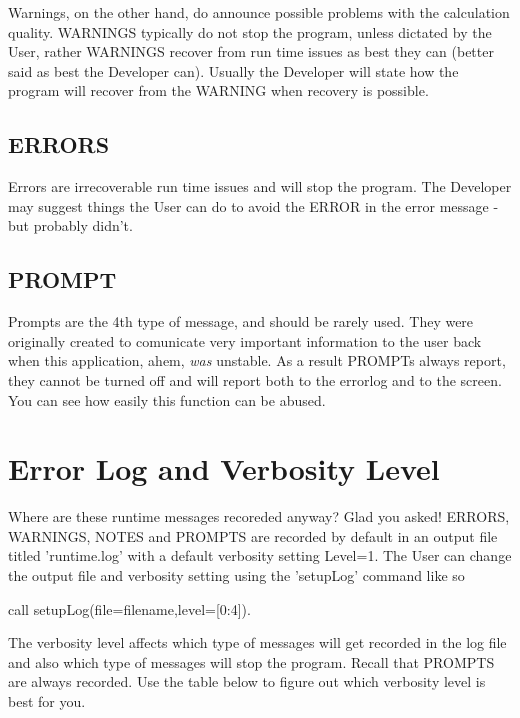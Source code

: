 Warnings, on the other hand, do announce possible problems with the calculation quality. W\-A\-R\-N\-I\-N\-G\-S typically do not stop the program, unless dictated by the User, rather W\-A\-R\-N\-I\-N\-G\-S recover from run time issues as best they can (better said as best the Developer can). Usually the Developer will state how the program will recover from the W\-A\-R\-N\-I\-N\-G when recovery is possible.\par
 \hypertarget{_interface_ERRORS}{}\subsection{E\-R\-R\-O\-R\-S}\label{_interface_ERRORS}
Errors are irrecoverable run time issues and will stop the program. The Developer may suggest things the User can do to avoid the E\-R\-R\-O\-R in the error message -\/ but probably didn't.\par
 \hypertarget{_interface_PROMPT}{}\subsection{P\-R\-O\-M\-P\-T}\label{_interface_PROMPT}
Prompts are the 4th type of message, and should be rarely used. They were originally created to comunicate very important information to the user back when this application, ahem, {\itshape was} unstable. As a result P\-R\-O\-M\-P\-Ts always report, they cannot be turned off and will report both to the errorlog and to the screen. You can see how easily this function can be abused.\par
 \hypertarget{_interface_ERRORLOG}{}\section{Error Log and Verbosity Level}\label{_interface_ERRORLOG}
Where are these runtime messages recoreded anyway? Glad you asked! E\-R\-R\-O\-R\-S, W\-A\-R\-N\-I\-N\-G\-S, N\-O\-T\-E\-S and P\-R\-O\-M\-P\-T\-S are recorded by default in an output file titled 'runtime.\-log' with a default verbosity setting Level=1. The User can change the output file and verbosity setting using the 'setup\-Log' command like so\par
 \par
 call setup\-Log(file=filename,level=\mbox{[}0\-:4\mbox{]}).\par
 \par
 The verbosity level affects which type of messages will get recorded in the log file and also which type of messages will stop the program. Recall that P\-R\-O\-M\-P\-T\-S are always recorded. Use the table below to figure out which verbosity level is best for you.\par
